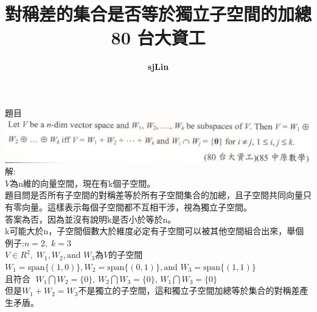 \documentclass{article}
\title{對稱差的集合是否等於獨立子空間的加總\\
80 台大資工}
\author{\textbf{sjLin}}
\begin{document}
\begin{CJK*}{UTF8}{bkai}
{\selectfont
\maketitle
\noindent
題目\\
\includegraphics[width=\textwidth]{./images/independent_subspace.png}\\
解:\\
$V$為n維的向量空間，現在有k個子空間。\\
題目問是否所有子空間的對稱差等於所有子空間集合的加總，且子空間共同向量只有零向量。這樣表示每個子空間都不互相干涉，視為獨立子空間。\\
答案為否，因為並沒有說明k是否小於等於n。\\
k可能大於n，子空間個數大於維度必定有子空間可以被其他空間組合出來，舉個例子:$n=2,\; k=3$\\
$
V\in R^2,\; W_1, W_2, \text{and }W_3
$為$V$的子空間\\
$
W_1=\text{span}\{(1,0)\}, W_2=\text{span}\{(0,1)\}, \text{and }W_3=\text{span}\{(1,1)\}
$\\
且符合$\;$
$W_1\bigcap W_2=\{0\}$, $W_2\bigcap W_3=\{0\}$,
$W_1\bigcap W_3=\{0\}$\\
但是$W_1+W_2=W_3$不是獨立的子空間，這和獨立子空間加總等於集合的對稱差產生矛盾。
} %
\end{CJK*}
\end{document}
